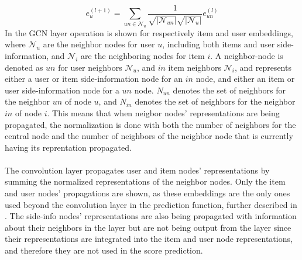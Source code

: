\begin{equation}\label{eq:csgcn_is_gc_layer_user}
     e_{u}^{(l+1)}=\sum_{un\in \mathcal{N}_{u}}\frac{1}{\sqrt{|\mathcal{N}_{un}|} \sqrt{|\mathcal{N}_{u}|}}e_{un}^{(l)}
\end{equation}
In  the GCN layer operation is shown for respectively item and user embeddings, where $\mathcal{N}_{u}$ are the neighbor nodes for user $u$, including both items and user side-information, and $\mathcal{N}_{i}$ are the neighboring nodes for item $i$. 
A neighbor-node is denoted as $un$ for user neighbors $\mathcal{N}_{u}$, and $in$ item neighbors $\mathcal{N}_{i}$, and represents either a user or item side-information node for an $in$ node, and either an item or user side-information node for a $un$ node.
$N_{un}$ denotes the set of neighbors for the neighbor $un$ of node $u$, and $N_{in}$ denotes the set of neighbors for the neighbor $in$ of node $i$.
This means that when neigbor nodes' representations are being propagated, the normalization is done with both the number of neighbors for the central node and the number of neighbors of the neighbor node that is currently having its reprentation propagated.
\\\\
The convolution layer propagates user and item nodes' representations by summing the normalized representations of the neighbor nodes.
Only the item and user nodes' propagations are shown, as these embeddings are the only ones used beyond the convolution layer in the prediction function, further described in .
The side-info nodes' representations are also being propagated with information about their neighbors in the layer but are not being output from the layer since their representations are integrated into the item and user node representations, and therefore they are not used in the score prediction.


